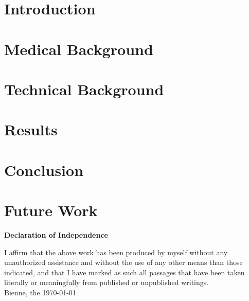 \documentclass[12pt,a4paper]{scrartcl}
\begin{document}
\newpage
{}

\section{Introduction}\label{s:introduction}

\section{Medical Background}\label{s:medical_background}

\section{Technical Background}
\section{Results}
\section{Conclusion}
\section{Future Work}


\markboth{}{}

\newpage





\newpage
\thispagestyle{empty}
\markboth{}{}
  \normalsize
\begin{center}
\huge{\textbf{ Declaration of Independence}}\\[40mm]
\end{center}
\large
I affirm that the above work has been produced by myself without any unauthorized assistance and without the use of any other means than those indicated, and that I have marked as such all passages that have been taken literally or meaningfully from published or unpublished writings.\\[50mm]
Bienne, the \today

\newpage
\end{document}
